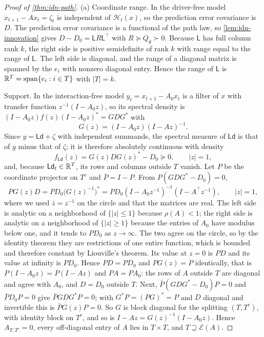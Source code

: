 \begin{proof}[Proof of \cref{thm:idn-path}]
(a) Coordinate range. In the driver-free model $x_{t+1}-Ax_t=\zeta_t$ is independent of $\mathcal H_t(x)$, so the prediction error covariance is $D$. The prediction error covariance is a functional of the path law, so \cref{lem:idn-innovation} gives $D-D_0=\mathsf LR\mathsf L^{\top}$ with $R\succeq Q_{\mathsf d}\succ0$. Because $\mathsf L$ has full column rank $k$, the right side is positive semidefinite of rank $k$ with range equal to the range of $\mathsf L$. The left side is diagonal, and the range of a diagonal matrix is spanned by the $e_i$ with nonzero diagonal entry. Hence the range of $\mathsf L$ is $\mathbb{R}^T=\operatorname{span}\{e_i:i\in T\}$ with $|T|=k$.

Support. In the interaction-free model $y_t=x_{t+1}-A_0x_t$ is a filter of $x$ with transfer function $z^{-1}(I-A_0z)$, so its spectral density is $(I-A_0z)f(z)(I-A_0z)^*=GDG^*$ with
\begin{equation}\label{eq:idn-G}
G(z)=(I-A_0z)(I-Az)^{-1}.
\end{equation}
Since $y=\mathsf L\mathsf d+\zeta$ with independent summands, the spectral measure of $\mathsf L\mathsf d$ is that of $y$ minus that of $\zeta$; it is therefore absolutely continuous with density
\begin{equation}\label{eq:idn-driver-density}
f_{\mathsf L\mathsf d}(z)=G(z)DG(z)^*-D_0\succeq0,\qquad|z|=1,
\end{equation}
and, because $\mathsf L\mathsf d_t\in\mathbb{R}^T$, its rows and columns outside $T$ vanish. Let $P$ be the coordinate projector on $T^c$ and $\bar P=I-P$. From $P(GDG^*-D_0)=0$,
\begin{equation}\label{eq:idn-liouville}
PG(z)D=PD_0\bigl(G(z)^{-1}\bigr)^*=PD_0(I-A_0z^{-1})^{-1}(I-A^{\top}z^{-1}),\qquad|z|=1,
\end{equation}
where we used $\bar z=z^{-1}$ on the circle and that the matrices are real. The left side is analytic on a neighborhood of $\{|z|\le1\}$ because $\rho(A)<1$; the right side is analytic on a neighborhood of $\{|z|\ge1\}$ because the entries of $A_0$ have modulus below one, and it tends to $PD_0$ as $z\to\infty$. The two agree on the circle, so by the identity theorem they are restrictions of one entire function, which is bounded and therefore constant by Liouville's theorem. Its value at $z=0$ is $PD$ and its value at infinity is $PD_0$. Hence $PD=PD_0$ and $PG(z)=P$ identically, that is $P(I-A_0z)=P(I-Az)$ and $PA=PA_0$: the rows of $A$ outside $T$ are diagonal and agree with $A_0$, and $D=D_0$ outside $T$. Next, $\bar P(GDG^*-D_0)P=0$ and $\bar PD_0P=0$ give $\bar PGDG^*P=0$; with $G^*P=(PG)^*=P$ and $D$ diagonal and invertible this is $\bar PG(z)P=0$. So $G$ is block diagonal for the splitting $(T,T^c)$, with identity block on $T^c$, and so is $I-Az=G(z)^{-1}(I-A_0z)$. Hence $A_{T,T^c}=0$, every off-diagonal entry of $A$ lies in $T\times T$, and $T\supseteq\mathcal E(A)$.


\end{proof}
